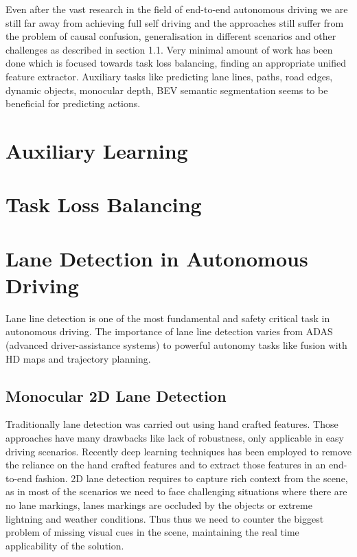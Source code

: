 Even after the vast research in the field of end-to-end autonomous driving we are still far away from achieving full self driving and the approaches still suffer from the problem of causal confusion, generalisation in different scenarios and other challenges as described in section 1.1. Very minimal amount of work has been done which is focused towards task loss balancing, finding an appropriate unified feature extractor. Auxiliary tasks like predicting lane lines, paths, road edges, dynamic objects, monocular depth, BEV semantic segmentation seems to be beneficial for predicting actions.

    \section{Auxiliary Learning}
    \section{Task Loss Balancing}
    \section{Lane Detection in Autonomous Driving}
    Lane line detection is one of the most fundamental and safety critical task in autonomous driving. The importance of lane line detection varies from ADAS (advanced driver-assistance systems) to powerful autonomy tasks like fusion with HD maps and trajectory planning.
        \subsection{Monocular 2D Lane Detection}
        Traditionally lane detection was carried out using hand crafted features. Those approaches have many drawbacks like lack of robustness, only applicable in easy driving scenarios. Recently deep learning techniques has been employed to remove the reliance on the hand crafted features and to extract those features in an end-to-end fashion. 2D lane detection requires to capture rich context from the scene, as in most of the scenarios we need to face challenging situations where there are no lane markings, lanes markings are occluded by the objects or extreme lightning and weather conditions. Thus thus we need to counter the biggest problem of missing visual cues in the scene, maintaining the real time applicability of the solution.
        

